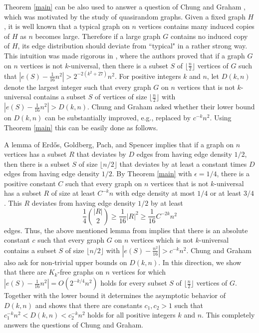 \documentclass[11pt]{article}
\begin{document}
Theorem \ref{main} can be also used to answer a question
of Chung and Graham \cite{ChGr}, which was motivated by the study of quasirandom graphs.
Given a fixed graph $H$, it is well known that a typical graph
on $n$ vertices  contains many induced copies of $H$ as $n$ becomes large.
Therefore if a large graph $G$ contains no induced copy of $H$, its edge distribution should deviate from
``typical" in a rather strong way. This intuition was made rigorous in \cite{ChGr}, where the authors
proved that if a graph $G$ on $n$ vertices is not $k$-universal,
then there is a subset $S$ of $\lfloor \frac{n}{2} \rfloor$ vertices
of $G$ such that $|e(S)-\frac{1}{16}n^2|>2^{-2(k^2+27)}n^2$. For
positive integers $k$ and $n$, let $D(k,n)$ denote the largest
integer such that every graph $G$ on $n$ vertices that is not
$k$-universal contains a subset $S$ of vertices of size $\lfloor
\frac{n}{2} \rfloor$ with $|e(S)-\frac{1}{16}n^2|>D(k,n)$. Chung and
Graham asked whether their lower bound on $D(k,n)$ can be
substantially improved, e.g., replaced by $c^{-k}n^2$.
Using Theorem \ref{main} this can be easily done as follows.

A lemma of Erd\H{o}s, Goldberg, Pach, and Spencer \cite{ErGoPaSp}
implies that if a graph on $n$ vertices has a subset $R$ that
deviates by $D$ edges from having edge density $1/2$, then there is
a subset $S$ of size $\lfloor n/2 \rfloor$ that deviates by at least a
constant times $D$ edges from having edge density $1/2$. By Theorem
\ref{main} with $\epsilon=1/4$, there is a positive constant $C$
such that every graph on $n$ vertices that is not $k$-universal has
a subset $R$ of size at least $C^{-k}n$ with edge density at most
$1/4$ or at least $3/4$. This $R$
deviates from having edge density $1/2$ by at least
$$\frac{1}{4}{|R| \choose 2}\geq \frac{1}{16}|R|^2 \geq
\frac{1}{16}C^{-2k}n^2$$ edges. Thus, the above mentioned lemma from
\cite{ErGoPaSp} implies that there is an absolute constant $c$ such
that every graph $G$ on $n$ vertices which is not $k$-universal
contains a subset $S$ of size $\lfloor n/2 \rfloor$ with
$|e(S)-\frac{n^2}{16}|>c^{-k}n^2$. Chung and Graham also ask for
non-trivial upper bounds on $D(k,n)$. In this direction, we show
that there are $K_k$-free graphs on $n$ vertices for which
$|e(S)-\frac{1}{16}n^2|=O(2^{-k/4}n^2)$ holds for every subset $S$
of $\lfloor \frac{n}{2} \rfloor$ vertices of $G$. Together with the
lower bound it determines the asymptotic behavior of $D(k,n)$ and
shows that there are constants $c_1,c_2>1$ such that
$c_1^{-k}n^2<D(k,n)<c_2^{-k}n^2$ holds for all positive integers $k$
and $n$. This completely answers the questions of Chung and Graham.
\end{document}
